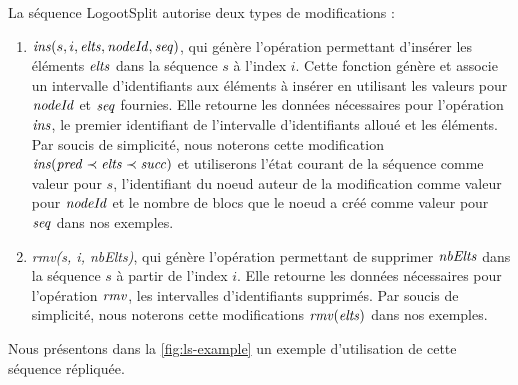 La séquence LogootSplit autorise deux types de modifications :
\begin{enumerate}
  \item $\mathit{ins}(s, i, \mathit{elts}, \mathit{nodeId}, \mathit{seq})$, qui génère l'opération permettant d'insérer les éléments $\mathit{elts}$ dans la séquence $s$ à l'index $i$.
    Cette fonction génère et associe un intervalle d'identifiants aux éléments à insérer en utilisant les valeurs pour $\mathit{nodeId}$ et $\mathit{seq}$ fournies.
    Elle retourne les données nécessaires pour l'opération $\mathit{ins}$, \ie le premier identifiant de l'intervalle d'identifiants alloué et les éléments.
    Par soucis de simplicité, nous noterons cette modification $\mathit{ins}(\mathit{pred} \prec \mathit{elts} \prec \mathit{succ})$ et utiliserons l'état courant de la séquence comme valeur pour $s$, l'identifiant du noeud auteur de la modification comme valeur pour $\mathit{nodeId}$ et le nombre de blocs que le noeud a créé comme valeur pour $\mathit{seq}$ dans nos exemples.
  \item  \emph{rmv(s, i, nbElts)}, qui génère l'opération permettant de supprimer $\mathit{nbElts}$ dans la séquence $s$ à partir de l'index $i$.
    Elle retourne les données nécessaires pour l'opération $\mathit{rmv}$, \ie les intervalles d'identifiants supprimés.
    Par soucis de simplicité, nous noterons cette modifications $\mathit{rmv}(\mathit{elts})$ dans nos exemples.
\end{enumerate}

Nous présentons dans la \autoref{fig:ls-example} un exemple d'utilisation de cette séquence répliquée.

